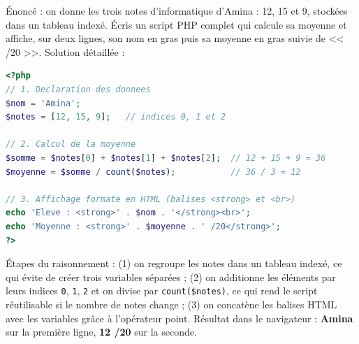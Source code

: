 \documentclass[11pt]{article}
\begin{document}
\begin{exoresolu}
Énoncé : on donne les trois notes d'informatique d'Amina : 12, 15 et 9, stockées dans un tableau indexé. Écris un script PHP complet qui calcule sa moyenne et affiche, sur deux lignes, son nom en gras puis sa moyenne en gras suivie de << /20 >>.
\tcblower
Solution détaillée :
\begin{lstlisting}[language=Php]
<?php
// 1. Declaration des donnees
$nom = 'Amina';
$notes = [12, 15, 9];   // indices 0, 1 et 2

// 2. Calcul de la moyenne
$somme = $notes[0] + $notes[1] + $notes[2];  // 12 + 15 + 9 = 36
$moyenne = $somme / count($notes);           // 36 / 3 = 12

// 3. Affichage formate en HTML (balises <strong> et <br>)
echo 'Eleve : <strong>' . $nom . '</strong><br>';
echo 'Moyenne : <strong>' . $moyenne . ' /20</strong>';
?>
\end{lstlisting}
Étapes du raisonnement : (1) on regroupe les notes dans un tableau indexé, ce qui évite de créer trois variables séparées ; (2) on additionne les éléments par leurs indices \texttt{0}, \texttt{1}, \texttt{2} et on divise par \texttt{count(\$notes)}, ce qui rend le script réutilisable si le nombre de notes change ; (3) on concatène les balises HTML avec les variables grâce à l'opérateur point. Résultat dans le navigateur : \textbf{Amina} sur la première ligne, \textbf{12 /20} sur la seconde.
\end{exoresolu}
\end{document}
